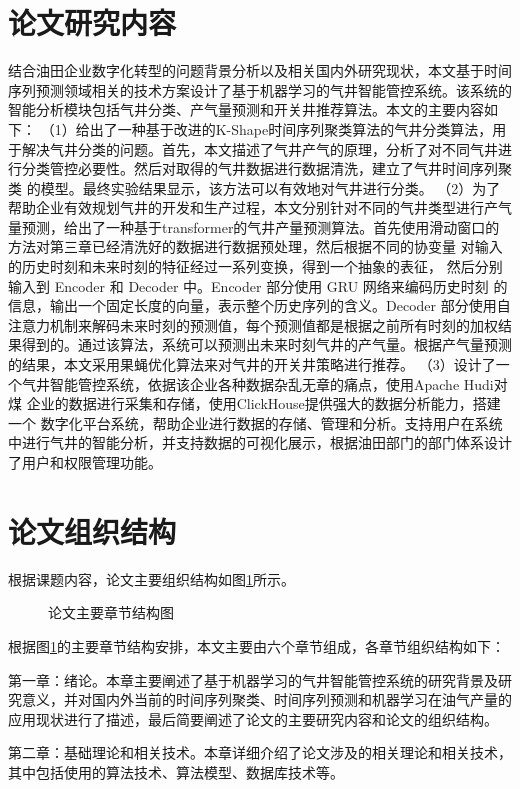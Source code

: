 \section{论文研究内容}
结合油田企业数字化转型的问题背景分析以及相关国内外研究现状，本文基于时间序列预测领域相关的技术方案设计了基于机器学习的气井智能管控系统。该系统的智能分析模块包括气井分类、产气量预测和开关井推荐算法。本文的主要内容如下：
（1）给出了一种基于改进的K-Shape时间序列聚类算法的气井分类算法，用于解决气井分类的问题。首先，本文描述了气井产气的原理，分析了对不同气井进行分类管控必要性。然后对取得的气井数据进行数据清洗，建立了气井时间序列聚类
的模型。最终实验结果显示，该方法可以有效地对气井进行分类。
（2）为了帮助企业有效规划气井的开发和生产过程，本文分别针对不同的气井类型进行产气量预测，给出了一种基于transformer的气井产量预测算法。首先使用滑动窗口的方法对第三章已经清洗好的数据进行数据预处理，然后根据不同的协变量
对输入的历史时刻和未来时刻的特征经过一系列变换，得到一个抽象的表征，
然后分别输入到 Encoder 和 Decoder 中。Encoder 部分使用 GRU 网络来编码历史时刻
的信息，输出一个固定长度的向量，表示整个历史序列的含义。Decoder 部分使用自
注意力机制来解码未来时刻的预测值，每个预测值都是根据之前所有时刻的加权结
果得到的。通过该算法，系统可以预测出未来时刻气井的产气量。根据产气量预测的结果，本文采用果蝇优化算法来对气井的开关井策略进行推荐。
（3）设计了一个气井智能管控系统，依据该企业各种数据杂乱无章的痛点，使用Apache Hudi对煤
企业的数据进行采集和存储，使用ClickHouse提供强大的数据分析能力，搭建一个
数字化平台系统，帮助企业进行数据的存储、管理和分析。支持用户在系统中进行气井的智能分析，并支持数据的可视化展示，根据油田部门的部门体系设计了用户和权限管理功能。
\section{论文组织结构}
根据课题内容，论文主要组织结构如图\ref{fig:paperStructure}所示。
\begin{figure}[H]
    \centering
    \caption{论文主要章节结构图}
    \label{fig:paperStructure}
\end{figure}
根据图\ref{fig:paperStructure}的主要章节结构安排，本文主要由六个章节组成，各章节组织结构如下：

第一章：绪论。本章主要阐述了基于机器学习的气井智能管控系统的研究背景及研究意义，并对国内外当前的时间序列聚类、时间序列预测和机器学习在油气产量的应用现状进行了描述，最后简要阐述了论文的主要研究内容和论文的组织结构。

第二章：基础理论和相关技术。本章详细介绍了论文涉及的相关理论和相关技术，其中包括使用的算法技术、算法模型、数据库技术等。

